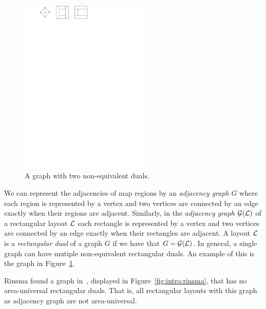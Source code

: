   \begin{figure}
    \centering
    \includegraphics[width=6cm]{introduction/img/nonuniqueRectDual.pdf}
    \caption{A graph with two non-equivalent duals.}
    \label{fig:intro:nonuniqueRectDual}
  \end{figure}

  We can represent the adjacencies of map regions by an \emph{adjacency graph} $G$ where each region is represented by a vertex and two vertices are connected by an edge exactly when their regions are adjacent.
  Similarly, in the \emph{adjacency graph} $\mathcal{G}(\mathcal{L})$ of a rectangular layout $\mathcal{L}$ each rectangle is represented by a vertex and two vertices are connected by an edge exactly when their rectangles are adjacent.
  A layout $\mathcal{L}$ is a \emph{rectangular dual} of a graph $G$ if we have that $G = \mathcal{G}(\mathcal{L})$.
  In general, a single graph can have mutiple non-equivalent rectangular duals. An example of this is the graph in Figure~\ref{fig:intro:nonuniqueRectDual}.

  Rinsma found a graph in~\cite{Rinsma1987}, displayed in Figure~\ref{fig:intro:rinsma}, that has no area-universal rectangular duals.
  That is, all rectangular layouts with this graph as adjacency graph are not area-universal.

